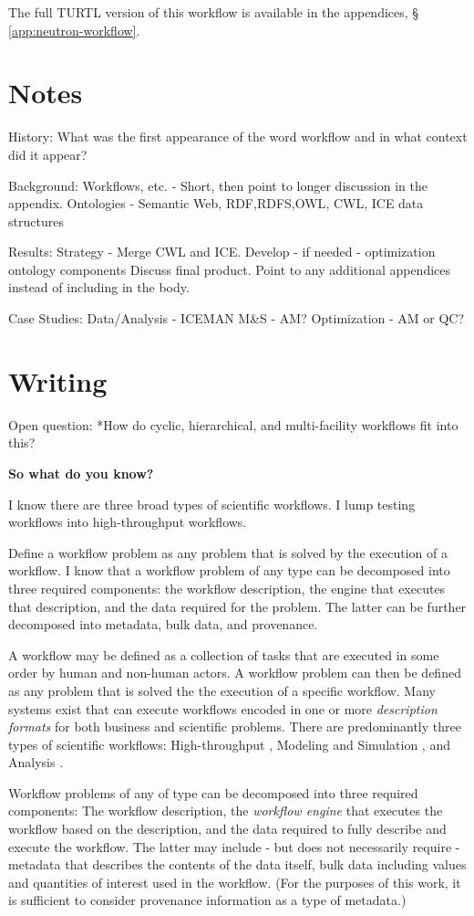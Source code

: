 The full TURTL version of this workflow is available in the appendices, \S
\ref{app:neutron-workflow}.

\section{Notes}

History:
What was the first appearance of the word workflow and in what context did it
appear?

Background:
Workflows, etc. - Short, then point to longer discussion in the appendix.
Ontologies - Semantic Web, {RDF,RDFS,OWL}, CWL, ICE data structures

Results:
Strategy - Merge CWL and ICE. Develop - if needed - optimization ontology components
Discuss final product. Point to any additional appendices instead of including in the body.

Case Studies:
Data/Analysis - ICEMAN
M\&S - AM?
Optimization - AM or QC?

\section{Writing}

Open question:
*How do cyclic, hierarchical, and multi-facility workflows fit into this?

\textbf{So what do you know?}

I know there are three broad types of scientific workflows. I lump testing
workflows into high-throughput workflows.

Define a workflow problem as any problem that is solved by the execution of a
workflow. I know that a workflow problem of any type can be decomposed into
three required components: the workflow description, the engine that executes
that description, and the data required for the problem. The latter can be
further decomposed into metadata, bulk data, and provenance.

A workflow may be defined as a collection of tasks that are executed in some
order by human and non-human actors. A workflow problem can then be defined as
any problem that is solved the the execution of a specific workflow. Many
systems exist that can execute workflows encoded in one or more
\textit{description formats} for both business and scientific problems. There
are predominantly three types of scientific workflows: High-throughput \cite{},
Modeling and Simulation \cite{}, and Analysis \cite{}.

Workflow problems of any of type can be decomposed into three required
components: The workflow description, the \textit{workflow engine} that
executes the workflow based on the description, and the data required to fully
describe and execute the workflow. The latter may include - but does not
necessarily require - metadata that describes the contents of the data itself,
bulk data including values and quantities of interest used in the workflow.
(For the purposes of this work, it is sufficient to consider provenance
information as a type of metadata.)
